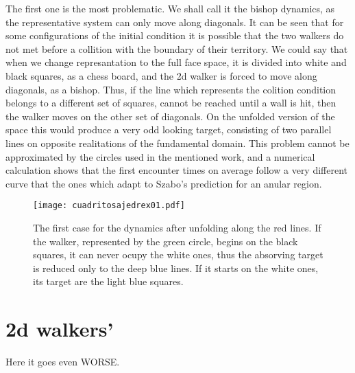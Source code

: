 \documentclass[leterpaper, 12pt]{article}
\begin{document}
The first one is the most problematic. We shall call it
the bishop dynamics, as the representative
system can only move along diagonals. 
It can be seen that for
some configurations of the initial condition it is possible
that the two walkers do not met before a collition
with the boundary of their territory. We could say that when we change
represantation to the full face space, it is divided into white and
black squares, as a chess board, and the 2d walker
is forced to move along diagonals, as a bishop. Thus, if the
line which represents the colition condition belongs to 
a different set of squares, cannot be reached until a wall is hit,
then the walker moves on the other set of diagonals. On the unfolded
version of the space this would produce a very odd looking
target, consisting of two parallel lines on opposite realitations
of the fundamental domain. This problem cannot be approximated by
the circles used in the mentioned work, and a numerical calculation
shows that the first encounter times on average follow a very
different curve that the ones which adapt to Szabo's prediction
for an anular region. 


\begin{figure}[h]
  \centering
  \texttt{[image: cuadritosajedrex01.pdf]}
  \caption{The first case for the dynamics after unfolding
    along the red lines. If the walker, represented by the green
    circle, begins on the black squares, it can never ocupy the
    white ones, thus the absorving target is reduced only to 
    the deep blue lines. If it starts on the white ones, its target 
    are the light blue squares. }
  \label{bishop01}
\end{figure}

\section{ 2d walkers'}

Here it goes even WORSE.
\end{document}
